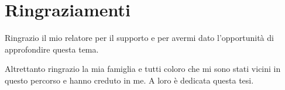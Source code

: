\chapter*{Ringraziamenti}
Ringrazio il mio relatore per il supporto e per avermi dato l'opportunità di approfondire questa tema.

Altrettanto ringrazio la mia famiglia e tutti coloro che mi sono stati vicini in questo percorso e hanno creduto in me.
A loro è dedicata questa tesi.